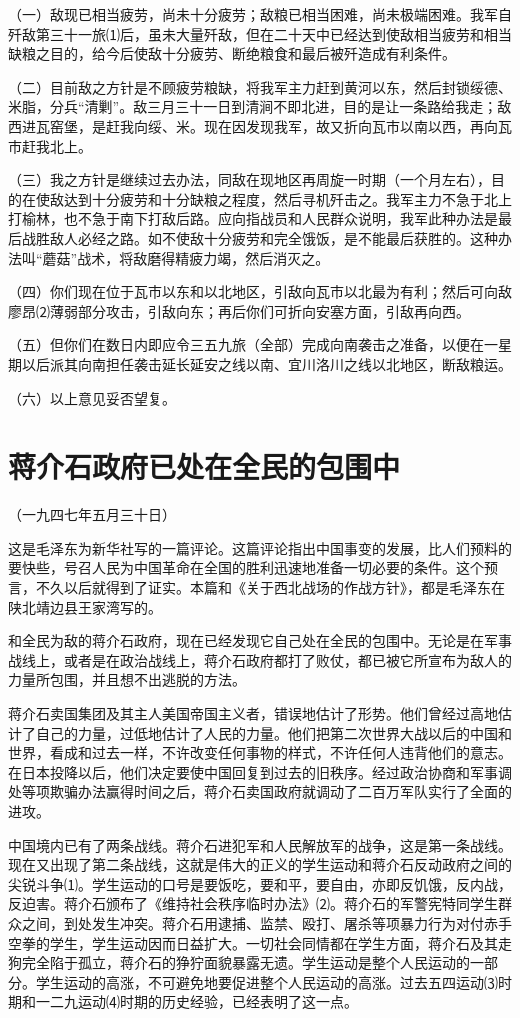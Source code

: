 \documentclass[UTF-8, a5paper, 12pt]{ctexart}
\begin{document}
（一）敌现已相当疲劳，尚未十分疲劳；敌粮已相当困难，尚未极端困难。我军自歼敌第三十一旅⑴后，虽未大量歼敌，但在二十天中已经达到使敌相当疲劳和相当缺粮之目的，给今后使敌十分疲劳、断绝粮食和最后被歼造成有利条件。

（二）目前敌之方针是不顾疲劳粮缺，将我军主力赶到黄河以东，然后封锁绥德、米脂，分兵“清剿”。敌三月三十一日到清涧不即北进，目的是让一条路给我走；敌西进瓦窑堡，是赶我向绥、米。现在因发现我军，故又折向瓦市以南以西，再向瓦市赶我北上。

（三）我之方针是继续过去办法，同敌在现地区再周旋一时期（一个月左右），目的在使敌达到十分疲劳和十分缺粮之程度，然后寻机歼击之。我军主力不急于北上打榆林，也不急于南下打敌后路。应向指战员和人民群众说明，我军此种办法是最后战胜敌人必经之路。如不使敌十分疲劳和完全饿饭，是不能最后获胜的。这种办法叫“蘑菇”战术，将敌磨得精疲力竭，然后消灭之。

（四）你们现在位于瓦市以东和以北地区，引敌向瓦市以北最为有利；然后可向敌廖昂⑵薄弱部分攻击，引敌向东；再后你们可折向安塞方面，引敌再向西。

（五）但你们在数日内即应令三五九旅（全部）完成向南袭击之准备，以便在一星期以后派其向南担任袭击延长延安之线以南、宜川洛川之线以北地区，断敌粮运。

（六）以上意见妥否望复。

\section{蒋介石政府已处在全民的包围中}

（一九四七年五月三十日）

这是毛泽东为新华社写的一篇评论。这篇评论指出中国事变的发展，比人们预料的要快些，号召人民为中国革命在全国的胜利迅速地准备一切必要的条件。这个预言，不久以后就得到了证实。本篇和《关于西北战场的作战方针》，都是毛泽东在陕北靖边县王家湾写的。

和全民为敌的蒋介石政府，现在已经发现它自己处在全民的包围中。无论是在军事战线上，或者是在政治战线上，蒋介石政府都打了败仗，都已被它所宣布为敌人的力量所包围，并且想不出逃脱的方法。

蒋介石卖国集团及其主人美国帝国主义者，错误地估计了形势。他们曾经过高地估计了自己的力量，过低地估计了人民的力量。他们把第二次世界大战以后的中国和世界，看成和过去一样，不许改变任何事物的样式，不许任何人违背他们的意志。在日本投降以后，他们决定要使中国回复到过去的旧秩序。经过政治协商和军事调处等项欺骗办法赢得时间之后，蒋介石卖国政府就调动了二百万军队实行了全面的进攻。

中国境内已有了两条战线。蒋介石进犯军和人民解放军的战争，这是第一条战线。现在又出现了第二条战线，这就是伟大的正义的学生运动和蒋介石反动政府之间的尖锐斗争⑴。学生运动的口号是要饭吃，要和平，要自由，亦即反饥饿，反内战，反迫害。蒋介石颁布了《维持社会秩序临时办法》⑵。蒋介石的军警宪特同学生群众之间，到处发生冲突。蒋介石用逮捕、监禁、殴打、屠杀等项暴力行为对付赤手空拳的学生，学生运动因而日益扩大。一切社会同情都在学生方面，蒋介石及其走狗完全陷于孤立，蒋介石的狰狞面貌暴露无遗。学生运动是整个人民运动的一部分。学生运动的高涨，不可避免地要促进整个人民运动的高涨。过去五四运动⑶时期和一二九运动⑷时期的历史经验，已经表明了这一点。
\end{document}
